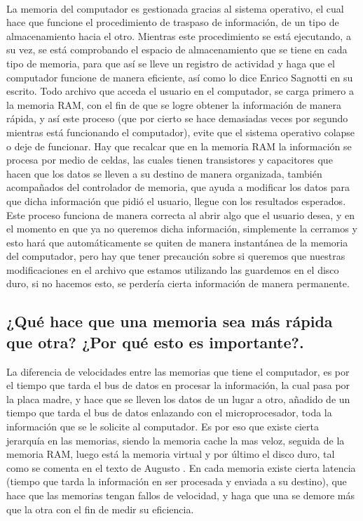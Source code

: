 \documentclass{article}
\begin{document}
\paragraph{}
La memoria del computador es gestionada gracias al sistema operativo, el cual hace que funcione el procedimiento de traspaso de información, de un tipo de almacenamiento hacia el otro. Mientras este procedimiento se está ejecutando, a su vez, se está comprobando el espacio de almacenamiento que se tiene en cada tipo de memoria, para que así se lleve un registro de actividad y haga que el computador funcione de manera eficiente, así como lo dice Enrico Sagnotti en su escrito\cite{memoria}. Todo archivo que acceda el usuario en el computador, se carga primero a la memoria RAM, con el fin de que se logre obtener la información de manera rápida, y así este proceso (que por cierto se hace demasiadas veces por segundo mientras está funcionando el computador), evite que el sistema operativo colapse o deje de funcionar. Hay que recalcar que en la memoria RAM la información se procesa por medio de celdas, las cuales tienen transistores y capacitores que hacen que los datos se lleven a su destino de manera organizada, también acompañados del controlador de memoria, que ayuda a modificar los datos para que dicha información que pidió el usuario, llegue con los resultados esperados. Este proceso funciona de manera correcta al abrir algo que el usuario desea, y en el momento en que ya no queremos dicha información, simplemente la cerramos y esto hará que automáticamente se quiten de manera instantánea de la memoria del computador, pero hay que tener precaución sobre si queremos que nuestras modificaciones en el archivo que estamos utilizando las guardemos en el disco duro, si no hacemos esto, se perdería cierta información de manera permanente.

\paragraph{}
\subsection{¿Qué hace que una memoria sea más rápida que otra? ¿Por qué esto es importante?.}
	La diferencia de velocidades entre las memorias que tiene el computador, es por el tiempo que tarda el bus de datos en procesar la información, la cual pasa por la placa madre, y hace que se lleven los datos de un lugar a otro, añadido de un tiempo que tarda el bus de datos enlazando con el microprocesador, toda la información que se le solicite al computador. Es por eso que existe cierta jerarquía en las memorias, siendo la memoria cache la mas veloz, seguida de la memoria RAM, luego está la memoria virtual y por último el disco duro, tal como se comenta en el texto de Augusto \cite{documento}. En cada memoria existe cierta latencia (tiempo que tarda la información en ser procesada y enviada a su destino), que hace que las memorias tengan fallos de velocidad, y haga que una se demore más que la otra con el fin de medir su eficiencia.
\end{document}
